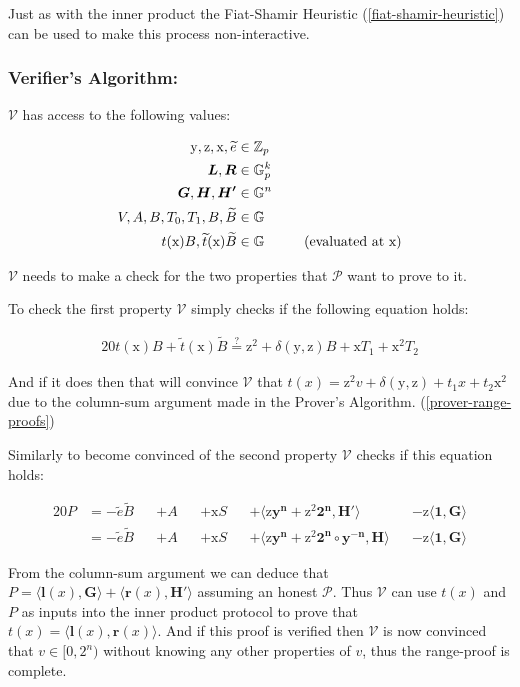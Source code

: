 \documentclass{article}
\newcommand{\eq}[1]{\begin{alignat*}{20}#1\end{alignat*}}
\newcommand{\eqn}[2]{\begin{equation}\label{#1}\begin{split}#2\end{split}\end{equation}}
\renewcommand{\vec}[1]{\boldsymbol{#1}}
\newcommand{\ran}[1]{\mathrm{#1}}
\newcommand{\vecran}[1]{\mathbf{#1}}
\newcommand{\V}{\mathcal{V}}
\renewcommand{\P}{\mathcal{P}}
\newcommand{\G}{\mathbb{G}}
\newcommand{\Z}{\mathbb{Z}}
\newcommand{\dotp}[2]{\langle #1, #2 \rangle}
\newcommand{\tB}{\widetilde{B}}
\renewcommand{\tt}{\widetilde{t}}
\begin{document}
Just as with the inner product the Fiat-Shamir Heuristic
(\ref{fiat-shamir-heuristic}) can be used to make this process
non-interactive.

\subsubsection{Verifier's Algorithm:} \label{verifier-range-proof}

$\V$ has access to the following values:

\eqn{range-def1-ver}{
	\ran{y}, \ran{z}, \ran{x}, \widetilde{e} &\in \Z_p \\
	\vec{L}, \vec{R} &\in \G_p^{k} \\
	\vec{G}, \vec{H}, \vec{H'} &\in \G^n \\
	V, A, B, T_0, T_1, B, \tB &\in \G \\
	t(\ran{x})B, \tt(\ran{x})\tB &\in \G \hspace*{1cm} \text{(evaluated at x)}
}

$\V$ needs to make a check for the two properties that $\P$ want to
prove to it.

To check the first property $\V$ simply checks if the following
equation holds:

\eq{
	t(\ran{x})B + \tt(\ran{x})\tB \stackrel{?}{=} \ran{z^2} + \delta(\ran{y},\ran{z})B + \ran{x}T_1 + \ran{x^2}T_2
}

And if it does then that will convince $\V$ that $t(x) = \ran{z^2}v +
\delta(\ran{y},\ran{z}) + t_1x + t_2\ran{x^2}$ due to the column-sum
argument made in the Prover's Algorithm. (\ref{prover-range-proofs})

Similarly to become convinced of the second property $\V$ checks if
this equation holds:

\eq{
	P &= -\widetilde{e}\tB &&+ A &&+ \ran{x}S &&+ \dotp{\ran{z}\vecran{y^n} + \ran{z^2}\vec{2^n}}{\vec{H'}} &&- \ran{z}\dotp{\vec{1}}{\vec{\vec{G}}} \\
	&= -\widetilde{e}\tB &&+ A &&+ \ran{x}S &&+ \dotp{\ran{z}\vecran{y^n} + \ran{z^2}\vec{2^n}\circ\vecran{y^{-n}}}{\vec{H}} &&- \ran{z}\dotp{\vec{1}}{\vec{G}}
}

From the column-sum argument we can deduce that $P =
\dotp{\vec{l}(x)}{\vec{G}} + \dotp{\vec{r}(x)}{\vec{H'}}$
assuming an honest $\P$. Thus $\V$ can use $t(x)$ and $P$ as
inputs into the inner product protocol to prove that $ t(x) =
\dotp{\vec{l}(x)}{\vec{r}(x)}$. And if this proof is verified then
$\V$ is now convinced that $v\in [0,2^n)$ without knowing any other
properties of $v$, thus the range-proof is complete.
\end{document}
